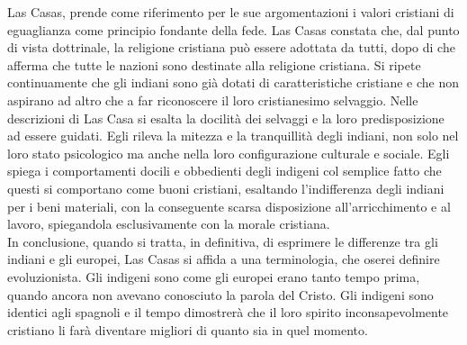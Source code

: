 \documentclass[11pt]{report}
\begin{document}
	Las Casas, prende come riferimento per le sue argomentazioni i valori cristiani di eguaglianza come principio fondante della fede. Las Casas constata che, dal punto di vista dottrinale, la religione cristiana può essere adottata da tutti, dopo di che afferma che tutte le nazioni sono destinate alla religione cristiana. Si ripete continuamente che gli indiani sono già dotati di caratteristiche cristiane e che non aspirano ad altro che a far riconoscere il loro cristianesimo selvaggio. Nelle descrizioni di Las Casa si esalta la docilità dei selvaggi e la loro predisposizione ad essere guidati. Egli rileva la mitezza e la tranquillità degli indiani, non solo nel loro stato psicologico ma anche nella loro configurazione culturale e sociale.\cite{de2015brevissima} Egli spiega i comportamenti docili e obbedienti degli indigeni col semplice fatto che questi si comportano come buoni cristiani, esaltando l'indifferenza degli indiani per i beni materiali, con la conseguente scarsa disposizione all'arricchimento e al lavoro, spiegandola esclusivamente con la morale cristiana.\\
	
	In conclusione, quando si tratta, in definitiva, di esprimere le differenze tra gli indiani e gli europei, Las Casas si affida a una terminologia, che oserei definire evoluzionista. Gli indigeni sono come gli europei erano tanto tempo prima, quando ancora non avevano conosciuto la parola del Cristo. Gli indigeni sono identici agli spagnoli e il tempo dimostrerà che il loro spirito inconsapevolmente cristiano li farà diventare migliori di quanto sia in quel momento.
	
	
	
	
\end{document}
